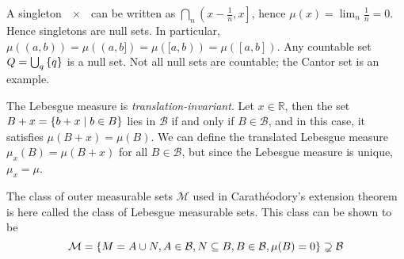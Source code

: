 \begin{remark}
	A singleton \( \qty{x} \) can be written as \( \bigcap_n \left(x-\frac 1n, x\right] \), hence \( \mu({x}) = \lim_n \frac 1n = 0 \).
	Hence singletons are null sets.
	In particular, \( \mu((a,b)) = \mu((a,b]) = \mu([a,b)) = \mu([a,b]) \).
	Any countable set \( Q = \bigcup_q \qty{q} \) is a null set.
	Not all null sets are countable; the Cantor set is an example.

	The Lebesgue measure is \emph{translation-invariant}.
	Let \( x \in \mathbb R \), then the set \( B + x = \qty{b + x \mid b \in B} \) lies in \( \mathcal B \) if and only if \( B \in \mathcal B \), and in this case, it satisfies \( \mu(B + x) = \mu(B) \).
	We can define the translated Lebesgue measure \( \mu_x(B) = \mu(B + x) \) for all \( B \in \mathcal B \), but since the Lebesgue measure is unique, \( \mu_x = \mu \).

	The class of outer measurable sets \( \mathcal M \) used in Carath\'eodory's extension theorem is here called the class of Lebesgue measurable sets.
	This class can be shown to be
	\[ \mathcal M = \qty{ M = A \cup N, A \in \mathcal B, N \subseteq B, B \in \mathcal B, \mu(B) = 0 } \supsetneq \mathcal B \]
\end{remark}
